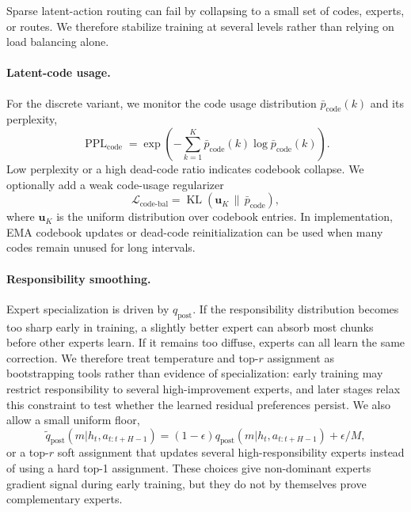 \documentclass[10pt]{article}
\newcommand{\KL}{\operatorname{KL}}
\newcommand{\achunk}{a_{t:t+H-1}}
\begin{document}
Sparse latent-action routing can fail by collapsing to a small set of codes, experts, or routes. We therefore stabilize training at several levels rather than relying on load balancing alone.

\paragraph{Latent-code usage.}
For the discrete variant, we monitor the code usage distribution $\bar{p}_{\mathrm{code}}(k)$ and its perplexity,
\begin{equation}
\operatorname{PPL}_{\mathrm{code}}=
\exp\left(-\sum_{k=1}^{K}\bar{p}_{\mathrm{code}}(k)\log \bar{p}_{\mathrm{code}}(k)\right).
\end{equation}
Low perplexity or a high dead-code ratio indicates codebook collapse. We optionally add a weak code-usage regularizer
\begin{equation}
\mathcal{L}_{\mathrm{code\mbox{-}bal}}
=\KL\left(\mathbf{u}_K\,\|\,\bar{p}_{\mathrm{code}}\right),
\end{equation}
where $\mathbf{u}_K$ is the uniform distribution over codebook entries. In implementation, EMA codebook updates or dead-code reinitialization can be used when many codes remain unused for long intervals.

\paragraph{Responsibility smoothing.}
Expert specialization is driven by $q_{\mathrm{post}}$. If the responsibility distribution becomes too sharp early in training, a slightly better expert can absorb most chunks before other experts learn. If it remains too diffuse, experts can all learn the same correction. We therefore treat temperature and top-$r$ assignment as bootstrapping tools rather than evidence of specialization: early training may restrict responsibility to several high-improvement experts, and later stages relax this constraint to test whether the learned residual preferences persist. We also allow a small uniform floor,
\begin{equation}
\tilde{q}_{\mathrm{post}}(m|h_t,\achunk)
=(1-\epsilon)q_{\mathrm{post}}(m|h_t,\achunk)+\epsilon/M,
\end{equation}
or a top-$r$ soft assignment that updates several high-responsibility experts instead of using a hard top-1 assignment. These choices give non-dominant experts gradient signal during early training, but they do not by themselves prove complementary experts.
\end{document}
